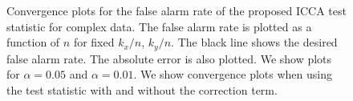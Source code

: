 
\begin{figure}
\begin{center}
  \caption{Convergence plots for the false alarm rate of the proposed ICCA test statistic for
    complex data. The false alarm rate is plotted as a function of $n$ for fixed $k_x/n$,
    $k_y/n$. The black line shows the desired false alarm rate. The absolute error is also
    plotted. We show plots for $\alpha=0.05$ and $\alpha=0.01$. We show convergence plots
    when using the test statistic with and without the correction term.}
  \label{fig:icca_conv_imag}
\end{center}
\end{figure}

